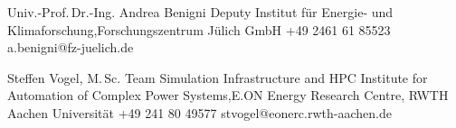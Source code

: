 \begin{cvReferences}

\cvRefereeNameOne%
    {Univ.-Prof.\,Dr.-Ing. Andrea Benigni}%
    {Deputy}%
    {Institut f{\"u}r Energie- und Klimaforschung,\newline Forschungszentrum J{\"u}lich GmbH}%
    {+49 2461 61 85523}%
    {a.benigni@fz-juelich.de}%

\cvRefereeNameTwo%
    {Steffen Vogel, M.\,Sc.}%
    {Team Simulation Infrastructure and HPC}%
    {Institute for Automation of Complex Power Systems,\newline E.ON Energy Research Centre, RWTH Aachen Universit{\"a}t}%
    {+49 241 80 49577}%
    {stvogel@eonerc.rwth-aachen.de}%


\cvRefereeFlush

\end{cvReferences}
